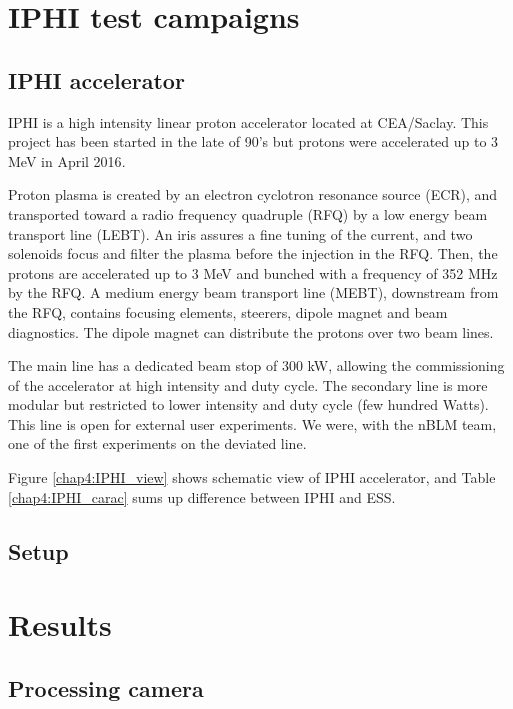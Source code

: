 \begin{refsection}
  \section{IPHI test campaigns}
  

  \subsection{IPHI accelerator}
  IPHI is a high intensity linear proton accelerator located at CEA/Saclay.
  This project has been started in the late of 90's\cite{Beau2000} but protons were accelerated up to 3 MeV in April 2016\cite{Gobin2016}.

  Proton plasma is created by an electron cyclotron resonance source (ECR), and transported toward a radio frequency quadruple (RFQ) by a low energy beam transport line (LEBT).
  An iris assures a fine tuning of the current, and two solenoids focus and filter the plasma before the injection in the RFQ.
  Then, the protons are accelerated up to 3 MeV and bunched with a frequency of 352 MHz by the RFQ.
  A medium energy beam transport line (MEBT), downstream from the RFQ, contains focusing elements, steerers, dipole magnet and beam diagnostics.
  The dipole magnet can distribute the protons over two beam lines.

  The main line has a dedicated beam stop of 300 kW, allowing the commissioning of the accelerator at high intensity and duty cycle.
  The secondary line is more modular but restricted to lower intensity and duty cycle (few hundred Watts).
  This line is open for external user experiments.
  We were, with the nBLM team, one of the first experiments on the deviated line\cite{Senee:IPAC2018-TUPAF016}.

  Figure \ref{chap4:IPHI_view} shows schematic view of IPHI accelerator, and Table \ref{chap4:IPHI_carac} sums up difference between IPHI and ESS.

  
  

  \subsection{Setup}

  \section{Results}
  \subsection{Processing camera}

\end{refsection}
